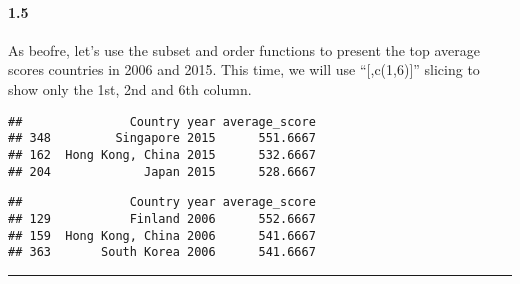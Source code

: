 \documentclass[]{article}
\newenvironment{Shaded}{\begin{snugshade}}{\end{snugshade}}
\newcommand{\KeywordTok}[1]{\textcolor[rgb]{0.13,0.29,0.53}{\textbf{#1}}}
\newcommand{\DataTypeTok}[1]{\textcolor[rgb]{0.13,0.29,0.53}{#1}}
\newcommand{\DecValTok}[1]{\textcolor[rgb]{0.00,0.00,0.81}{#1}}
\newcommand{\StringTok}[1]{\textcolor[rgb]{0.31,0.60,0.02}{#1}}
\newcommand{\OtherTok}[1]{\textcolor[rgb]{0.56,0.35,0.01}{#1}}
\newcommand{\OperatorTok}[1]{\textcolor[rgb]{0.81,0.36,0.00}{\textbf{#1}}}
\newcommand{\NormalTok}[1]{#1}
\let\oldparagraph\paragraph
\renewcommand{\paragraph}[1]{\oldparagraph{#1}\mbox{}}
\begin{document}
\paragraph{1.5}\label{section-4}

As beofre, let's use the subset and order functions to present the top
average scores countries in 2006 and 2015. This time, we will use
``{[},c(1,6){]}'' slicing to show only the 1st, 2nd and 6th column.

\begin{Shaded}
\end{Shaded}

\begin{verbatim}
##               Country year average_score
## 348         Singapore 2015      551.6667
## 162  Hong Kong, China 2015      532.6667
## 204             Japan 2015      528.6667
\end{verbatim}

\begin{Shaded}
\end{Shaded}

\begin{verbatim}
##               Country year average_score
## 129           Finland 2006      552.6667
## 159  Hong Kong, China 2006      541.6667
## 363       South Korea 2006      541.6667
\end{verbatim}

\begin{center}\rule{0.5\linewidth}{\linethickness}\end{center}
\end{document}
